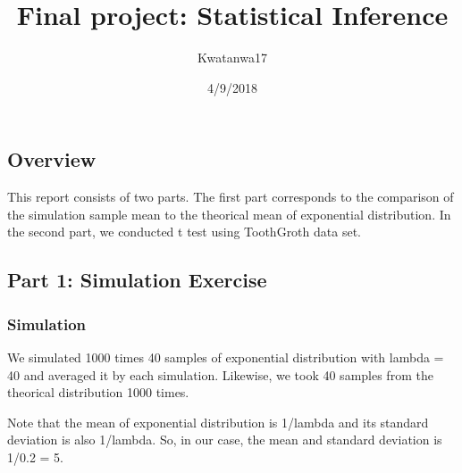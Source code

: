 \documentclass[]{article}
\title{Final project: Statistical Inference}
\author{Kwatanwa17}
\date{4/9/2018}
\begin{document}
\maketitle

\subsection{Overview}\label{overview}

This report consists of two parts. The first part corresponds to the
comparison of the simulation sample mean to the theorical mean of
exponential distribution. In the second part, we conducted t test using
ToothGroth data set.

\subsection{Part 1: Simulation
Exercise}\label{part-1-simulation-exercise}

\subsubsection{Simulation}\label{simulation}

We simulated 1000 times 40 samples of exponential distribution with
lambda = 40 and averaged it by each simulation. Likewise, we took 40
samples from the theorical distribution 1000 times.

Note that the mean of exponential distribution is 1/lambda and its
standard deviation is also 1/lambda. So, in our case, the mean and
standard deviation is 1/0.2 = 5.
\end{document}

